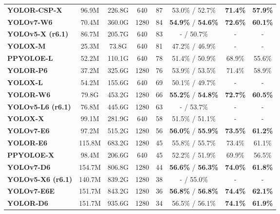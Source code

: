 \documentclass[10pt,twocolumn,letterpaper]{article}
\begin{document}
\begin{table*}[t]
\begin{threeparttable}[t]
\begin{tabular}{l|c|c|c|c|c|c|c}
					\textbf{YOLOR-CSP-X \cite{wang2021you}} & 96.9M & 226.8G & 640 & 87 & 53.0\% / 52.7\% & \textbf{71.4\%} & \textbf{57.9\%} \\
					\textbf{YOLOv7-W6} & 70.4M & 360.0G & 1280 & 84 & \textbf{54.9\%} / \textbf{54.6\%} & \textbf{72.6\%} & \textbf{60.1\%} \\
					\textbf{YOLOv5-X (r6.1) \cite{glenn2022yolov5}} & 86.7M & 205.7G & 640 & 83 & - / 50.7\% & - & - \\
					\textbf{YOLOX-M \cite{ge2021yolox}} & 25.3M & 73.8G & 640 & 81 & 47.2\% / 46.9\% & - & - \\
					\textbf{PPYOLOE-L \cite{xu2022pp}} & 52.2M & 110.1G & 640 & 78 & 51.4\% / 50.9\% & 68.9\% & 55.6\% \\
					\textbf{YOLOR-P6 \cite{wang2021you}} & 37.2M & 325.6G & 1280 & 76 & 53.9\% / 53.5\% & 71.4\% & 58.9\% \\
					\textbf{YOLOX-L \cite{ge2021yolox}} & 54.2M & 155.6G & 640 & 69 & 50.1\% / 49.7\% & - & - \\
					\textbf{YOLOR-W6 \cite{wang2021you}} & 79.8G & 453.2G & 1280 & 66 & \textbf{55.2\%} / \textbf{54.8\%} & \textbf{72.7\%} & \textbf{60.5\%} \\
					\textbf{YOLOv5-L6 (r6.1) \cite{glenn2022yolov5}} & 76.8M & 445.6G & 1280 & 63 & - / 53.7\% & - & - \\
					\midrule
					\textbf{YOLOX-X \cite{ge2021yolox}} & 99.1M & 281.9G & 640 & 58 & 51.5\% / 51.1\% & - & - \\
					\textbf{YOLOv7-E6} & 97.2M & 515.2G & 1280 & 56 & \textbf{56.0\%} / \textbf{55.9\%} & \textbf{73.5\%} & \textbf{61.2\%} \\
					\textbf{YOLOR-E6 \cite{wang2021you}} & 115.8M & 683.2G & 1280 & 45 & 55.8\% / 55.7\% & 73.4\% & 61.1\% \\
					\textbf{PPYOLOE-X \cite{xu2022pp}} & 98.4M & 206.6G & 640 & 45 & 52.2\% / 51.9\% & 69.9\% & 56.5\% \\
					\textbf{YOLOv7-D6} & 154.7M & 806.8G & 1280 & 44 & \textbf{56.6\%} / \textbf{56.3\%} & \textbf{74.0\%} & \textbf{61.8\%} \\
					\textbf{YOLOv5-X6 (r6.1) \cite{glenn2022yolov5}} & 140.7M & 839.2G & 1280 & 38 & - / 55.0\% & - & - \\
					\textbf{YOLOv7-E6E} & 151.7M & 843.2G & 1280 & 36 & \textbf{56.8\%} / \textbf{56.8\%} & \textbf{74.4\%} & \textbf{62.1\%} \\
					\textbf{YOLOR-D6 \cite{wang2021you}} & 151.7M & 935.6G & 1280 & 34 & 56.5\% / 56.1\% & \textbf{74.1\%} & \textbf{61.9\%} \\

\end{tabular}
\end{threeparttable}
\end{table*}
\end{document}
